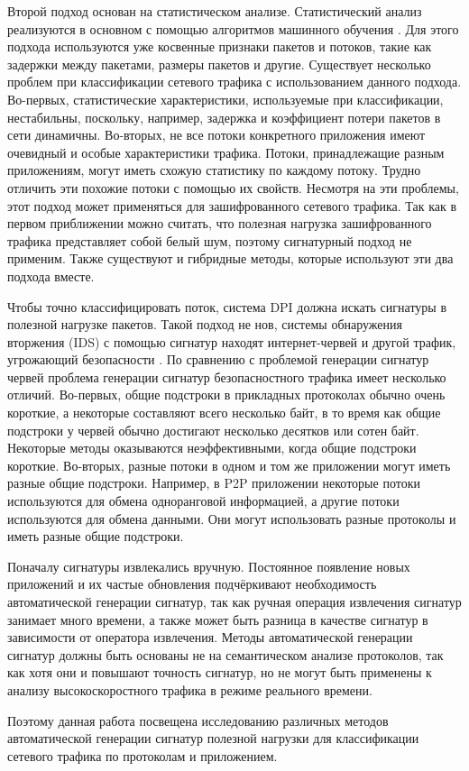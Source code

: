 Второй подход основан на статистическом анализе. Статистический анализ реализуются в основном с помощью алгоритмов машинного обучения \cite{erman2006qrp05}.
Для этого подхода используются уже косвенные признаки пакетов и потоков, такие как задержки между пакетами, размеры пакетов и другие.
Существует несколько проблем при классификации сетевого трафика с использованием данного подхода.
Во-первых, статистические характеристики, используемые при классификации, нестабильны, поскольку, например, задержка и коэффициент потери пакетов в сети динамичны.
Во-вторых, не все потоки конкретного приложения имеют очевидный и особые характеристики трафика.
Потоки, принадлежащие разным приложениям, могут иметь схожую статистику по каждому потоку. Трудно отличить эти похожие потоки с помощью их свойств.
Несмотря на эти проблемы, этот подход может применяться для зашифрованного сетевого трафика.
Так как в первом приближении можно считать, что полезная нагрузка зашифрованного трафика представляет собой белый шум,
поэтому сигнатурный подход не применим.
Также существуют и гибридные методы, которые используют эти два подхода вместе.

Чтобы точно классифицировать поток, система DPI должна искать сигнатуры в полезной нагрузке пакетов.
Такой подход не нов, системы обнаружения вторжения (IDS) с помощью сигнатур находят интернет-червей и другой трафик, угрожающий безопасности
\cite{singh2004automated, kim2004autograph, newsome2005polygraph}.
По сравнению с проблемой генерации сигнатур червей проблема генерации сигнатур безопасностного трафика имеет несколько отличий.
Во-первых, общие подстроки в прикладных протоколах обычно очень короткие, а некоторые составляют всего несколько байт,
в то время как общие подстроки у червей обычно достигают несколько десятков или сотен байт.
Некоторые методы \cite{singh2004automated, kim2004autograph} оказываются неэффективными, когда общие подстроки короткие.
Во-вторых, разные потоки в одном и том же приложении могут иметь разные общие подстроки.
Например, в P2P приложении некоторые потоки используются для обмена одноранговой информацией,
а другие потоки используются для обмена данными. Они могут использовать разные протоколы и иметь разные общие подстроки.

Поначалу сигнатуры извлекались вручную. Постоянное появление новых приложений и их частые обновления подчёркивают необходимость автоматической генерации сигнатур,
так как ручная операция извлечения сигнатур занимает много времени, а также может быть разница в качестве сигнатур в зависимости от оператора извлечения.
Методы автоматической генерации сигнатур должны быть основаны не на семантическом анализе протоколов, так как хотя они и повышают точность сигнатур,
но не могут быть применены к анализу высокоскоростного трафика в режиме реального времени.

Поэтому данная работа посвещена исследованию различных методов автоматической генерации сигнатур полезной нагрузки для классификации сетевого трафика по протоколам и приложением.

\newpage
